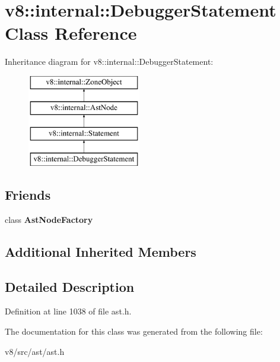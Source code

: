 \hypertarget{classv8_1_1internal_1_1DebuggerStatement}{}\section{v8\+:\+:internal\+:\+:Debugger\+Statement Class Reference}
\label{classv8_1_1internal_1_1DebuggerStatement}
Inheritance diagram for v8\+:\+:internal\+:\+:Debugger\+Statement\+:\begin{figure}[H]
\begin{center}
\leavevmode
\includegraphics[height=4.000000cm]{classv8_1_1internal_1_1DebuggerStatement}
\end{center}
\end{figure}
\subsection*{Friends}
\begin{DoxyCompactItemize}
\item 
\mbox{\label{classv8_1_1internal_1_1DebuggerStatement_a8d587c8ad3515ff6433eb83c578e795f}} 
class {\bfseries Ast\+Node\+Factory}
\end{DoxyCompactItemize}
\subsection*{Additional Inherited Members}


\subsection{Detailed Description}


Definition at line 1038 of file ast.\+h.



The documentation for this class was generated from the following file\+:\begin{DoxyCompactItemize}
\item 
v8/src/ast/ast.\+h\end{DoxyCompactItemize}
